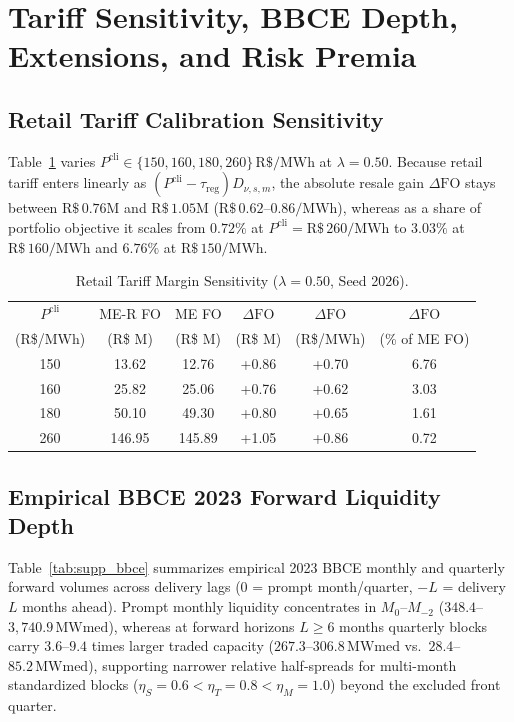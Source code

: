 \documentclass[10pt,journal]{IEEEtran}
\begin{document}
\section{Tariff Sensitivity, BBCE Depth, Extensions, and Risk Premia}
\label{sec:supp_ext}

\subsection{Retail Tariff Calibration Sensitivity}
Table~\ref{tab:supp_tarifa} varies $P^{\text{cli}} \in \{150, 160, 180, 260\}\,\text{R\$/MWh}$ at $\lambda = 0.50$. Because retail tariff enters linearly as $(P^{\text{cli}} - \tau_{\text{reg}}) D_{\nu,s,m}$, the absolute resale gain $\Delta\mathrm{FO}$ stays between $\text{R\$}\,0.76\text{M}$ and $\text{R\$}\,1.05\text{M}$ ($\text{R\$}\,0.62$--$0.86/\text{MWh}$), whereas as a share of portfolio objective it scales from $0.72\%$ at $P^{\text{cli}} = \text{R\$}\,260/\text{MWh}$ to $3.03\%$ at $\text{R\$}\,160/\text{MWh}$ and $6.76\%$ at $\text{R\$}\,150/\text{MWh}$.

\begin{table}[htbp]
\centering
\caption{Retail Tariff Margin Sensitivity ($\lambda = 0.50$, Seed 2026).}
\label{tab:supp_tarifa}
\scriptsize
\setlength{\tabcolsep}{2.4pt}
\begin{tabular}{cccccc}
\toprule
$P^{\text{cli}}$ & ME-R FO & ME FO & $\Delta\mathrm{FO}$ & $\Delta\mathrm{FO}$ & $\Delta\mathrm{FO}$ \\
(R\$/MWh) & (R\$ M) & (R\$ M) & (R\$ M) & (R\$/MWh) & (\% of ME FO) \\
\midrule
150 & 13.62 & 12.76 & +0.86 & +0.70 & 6.76 \\
160 & 25.82 & 25.06 & +0.76 & +0.62 & 3.03 \\
180 & 50.10 & 49.30 & +0.80 & +0.65 & 1.61 \\
260 & 146.95 & 145.89 & +1.05 & +0.86 & 0.72 \\
\bottomrule
\end{tabular}
\end{table}

\subsection{Empirical BBCE 2023 Forward Liquidity Depth}
Table~\ref{tab:supp_bbce} summarizes empirical 2023 BBCE monthly and quarterly forward volumes across delivery lags ($0$ = prompt month/quarter, $-L$ = delivery $L$ months ahead). Prompt monthly liquidity concentrates in $M_0$--$M_{-2}$ ($348.4$--$3,740.9\,\text{MWmed}$), whereas at forward horizons $L \ge 6$ months quarterly blocks carry $3.6$--$9.4$ times larger traded capacity ($267.3$--$306.8\,\text{MWmed}$ vs.\ $28.4$--$85.2\,\text{MWmed}$), supporting narrower relative half-spreads for multi-month standardized blocks ($\eta_S = 0.6 < \eta_T = 0.8 < \eta_M = 1.0$) beyond the excluded front quarter.
\end{document}
